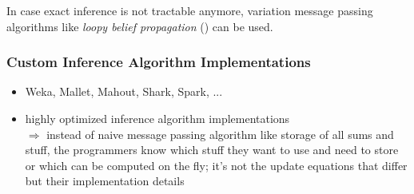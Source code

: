 In case exact inference is not tractable anymore, variation message passing algorithms like \emph{loopy belief propagation} (\cite{frey1998revolution}) can be used.

\subsubsection{Custom Inference Algorithm Implementations}
\label{subsec:custom-inference}

\begin{itemize}
\item Weka, Mallet, Mahout, Shark, Spark, ...
\item highly optimized inference algorithm implementations\\
$\Rightarrow$ instead of naive message passing algorithm like storage of all sums and stuff, the programmers know which stuff they want to use and need to store or which can be computed on the fly; it's not the update equations that differ but their implementation details
\end{itemize}

